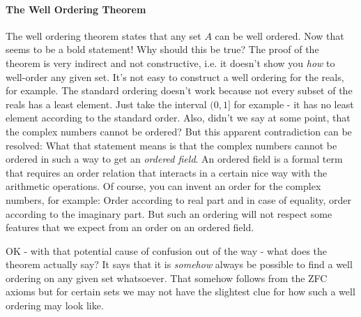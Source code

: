 
\paragraph{The Well Ordering Theorem} 
The well ordering theorem states that any set $A$ can be well ordered. Now that seems to be a bold statement! Why should this be true? The proof of the theorem is very indirect and not constructive, i.e. it doesn't show you \emph{how} to well-order any given set. It's not easy to construct a well ordering for the reals, for example. The standard ordering doesn't work because not every subset of the reals has a least element. Just take the interval $(0,1]$ for example - it has no least element according to the standard order. Also, didn't we say at some point, that the complex numbers cannot be ordered? But this apparent contradiction can be resolved: What that statement means is that the complex numbers cannot be ordered in such a way to get an \emph{ordered field}. An ordered field is a formal term that requires an order relation that interacts in a certain nice way with the arithmetic operations. Of course, you can invent an order for the complex numbers, for example: Order according to real part and in case of equality, order according to the imaginary part. But such an ordering will not respect some features that we expect from an order on an ordered field.

\medskip
OK - with that potential cause of confusion out of the way - what does the theorem actually say? It says that it is \emph{somehow} always be possible to find a well ordering on any given set whatsoever. That somehow follows from the ZFC axioms but for certain sets we may not have the slightest clue for how such a well ordering may look like. 





